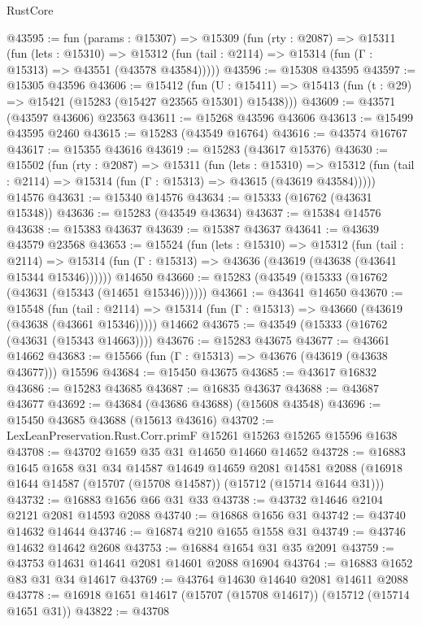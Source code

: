 \begin{lexlean}{RustCore}
\begin{coremodule}
@43595 := fun (params : @15307) =>
  @15309
    (fun (rty : @2087) =>
    @15311
      (fun (lets : @15310) =>
      @15312 (fun (tail : @2114) => @15314 (fun (Γ : @15313) => @43551 (@43578 @43584)))))
@43596 := @15308 @43595
@43597 := @15305 @43596
@43606 := @15412
    (fun (U : @15411) => @15413 (fun (t : @29) => @15421 (@15283 (@15427 @23565 @15301) @15438)))
@43609 := @43571 (@43597 @43606) @23563
@43611 := @15268 @43596 @43606
@43613 := @15499 @43595 @2460
@43615 := @15283 (@43549 @16764)
@43616 := @43574 @16767
@43617 := @15355 @43616
@43619 := @15283 (@43617 @15376)
@43630 := @15502
    (fun (rty : @2087) =>
    @15311
      (fun (lets : @15310) =>
      @15312 (fun (tail : @2114) => @15314 (fun (Γ : @15313) => @43615 (@43619 @43584)))))
    @14576
@43631 := @15340 @14576
@43634 := @15333 (@16762 (@43631 @15348))
@43636 := @15283 (@43549 @43634)
@43637 := @15384 @14576
@43638 := @15383 @43637
@43639 := @15387 @43637
@43641 := @43639 @43579 @23568
@43653 := @15524
    (fun (lets : @15310) =>
    @15312
      (fun (tail : @2114) =>
      @15314 (fun (Γ : @15313) => @43636 (@43619 (@43638 (@43641 @15344 @15346))))))
    @14650
@43660 := @15283 (@43549 (@15333 (@16762 (@43631 (@15343 (@14651 @15346))))))
@43661 := @43641 @14650
@43670 := @15548
    (fun (tail : @2114) => @15314 (fun (Γ : @15313) => @43660 (@43619 (@43638 (@43661 @15346)))))
    @14662
@43675 := @43549 (@15333 (@16762 (@43631 (@15343 @14663))))
@43676 := @15283 @43675
@43677 := @43661 @14662
@43683 := @15566 (fun (Γ : @15313) => @43676 (@43619 (@43638 @43677))) @15596
@43684 := @15450 @43675
@43685 := @43617 @16832
@43686 := @15283 @43685
@43687 := @16835 @43637
@43688 := @43687 @43677
@43692 := @43684 (@43686 @43688) (@15608 @43548)
@43696 := @15450 @43685 @43688 (@15613 @43616)
@43702 := LexLeanPreservation.Rust.Corr.primF @15261 @15263 @15265 @15596 @1638
@43708 := @43702 @1659 @35 @31 @14650 @14660 @14652
@43728 := @16883
    @1645
    @1658
    @31
    @34
    @14587
    @14649
    @14659
    @2081
    @14581
    @2088
    (@16918 @1644 @14587 (@15707 (@15708 @14587)) (@15712 (@15714 @1644 @31)))
@43732 := @16883 @1656 @66 @31 @33
@43738 := @43732 @14646 @2104 @2121 @2081 @14593 @2088
@43740 := @16868 @1656 @31
@43742 := @43740 @14632 @14644
@43746 := @16874 @210 @1655 @1558 @31
@43749 := @43746 @14632 @14642 @2608
@43753 := @16884 @1654 @31 @35 @2091
@43759 := @43753 @14631 @14641 @2081 @14601 @2088 @16904
@43764 := @16883 @1652 @83 @31 @34 @14617
@43769 := @43764 @14630 @14640 @2081 @14611 @2088
@43778 := @16918 @1651 @14617 (@15707 (@15708 @14617)) (@15712 (@15714 @1651 @31))
@43822 := @43708

\end{coremodule}
\end{lexlean}
